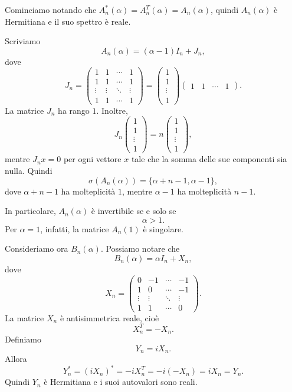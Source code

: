 \documentclass[a4paper]{article}
\begin{document}
\begin{snippetsolution}{}
    Cominciamo notando che \(A_n^*(\alpha) = A_n^T(\alpha) = A_n(\alpha)\),
    quindi \(A_n(\alpha)\) è Hermitiana e il suo spettro è reale.

    Scriviamo
    \[
        A_n(\alpha) = (\alpha - 1)I_n + J_n,
    \]
    dove
    \[
        J_n =
        \begin{pmatrix}
            1 & 1 & \cdots & 1 \\
            1 & 1 & \cdots & 1 \\
            \vdots & \vdots & \ddots & \vdots \\
            1 & 1 & \cdots & 1
        \end{pmatrix}
        =
        \begin{pmatrix}
            1 \\ 1 \\ \vdots \\ 1
        \end{pmatrix}
        \begin{pmatrix}
            1 & 1 & \cdots & 1
        \end{pmatrix}.
    \]
    La matrice \(J_n\) ha rango \(1\). Inoltre,
    \[
        J_n
        \begin{pmatrix}
            1 \\ 1 \\ \vdots \\ 1
        \end{pmatrix}
        =
        n
        \begin{pmatrix}
            1 \\ 1 \\ \vdots \\ 1
        \end{pmatrix},
    \]
    mentre \(J_nx = 0\) per ogni vettore \(x\) tale che la somma delle sue componenti sia nulla.
    Quindi
    \[
        \sigma(A_n(\alpha)) = \{\alpha+n-1, \alpha-1\},
    \]
    dove \(\alpha+n-1\) ha molteplicità \(1\), mentre \(\alpha-1\)
    ha molteplicità \(n-1\).

    In particolare, \(A_n(\alpha)\) è invertibile se e solo se
    \[
        \alpha > 1.
    \]
    Per \(\alpha = 1\), infatti, la matrice \(A_n(1)\) è singolare.

    Consideriamo ora \(B_n(\alpha)\). Possiamo notare che
    \[
        B_n(\alpha) = \alpha I_n + X_n,
    \]
    dove
    \[
        X_n =
        \begin{pmatrix}
            0 & -1 & \cdots & -1 \\
            1 & 0 & \cdots & -1 \\
            \vdots & \vdots & \ddots & \vdots \\
            1 & 1 & \cdots & 0
        \end{pmatrix}.
    \]
    La matrice \(X_n\) è antisimmetrica reale, cioè
    \[
        X_n^T = -X_n.
    \]
    Definiamo
    \[
        Y_n = iX_n.
    \]
    Allora
    \[
        Y_n^* = (iX_n)^* = -iX_n^T = -i(-X_n) = iX_n = Y_n.
    \]
    Quindi \(Y_n\) è Hermitiana e i suoi autovalori sono reali.


\end{snippetsolution}
\end{document}
